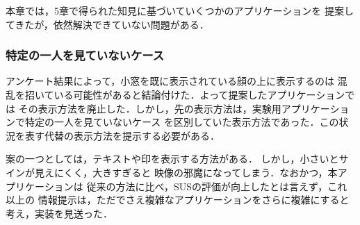 本章では，5章で得られた知見に基づいていくつかのアプリケーションを
提案してきたが，依然解決できていない問題がある．

\subsubsection*{特定の一人を見ていないケース}
アンケート結果によって，小窓を既に表示されている顔の上に表示するのは
混乱を招いている可能性があると結論付けた．よって提案したアプリケーションでは
その表示方法を廃止した．しかし，先の表示方法は，実験用アプリケーションで特定の一人を見ていないケース
を区別していた表示方法であった．この状況を表す代替の表示方法を提示する必要がある．

案の一つとしては，テキストや印を表示する方法がある．
しかし，小さいとサインが見えにくく，大きすぎると
映像の邪魔になってしまう．なおかつ，本アプリケーションは
従来の方法に比べ，SUSの評価が向上したとは言えず，これ以上の
情報提示は，ただでさえ複雑なアプリケーションをさらに複雑にすると
考え，実装を見送った．

